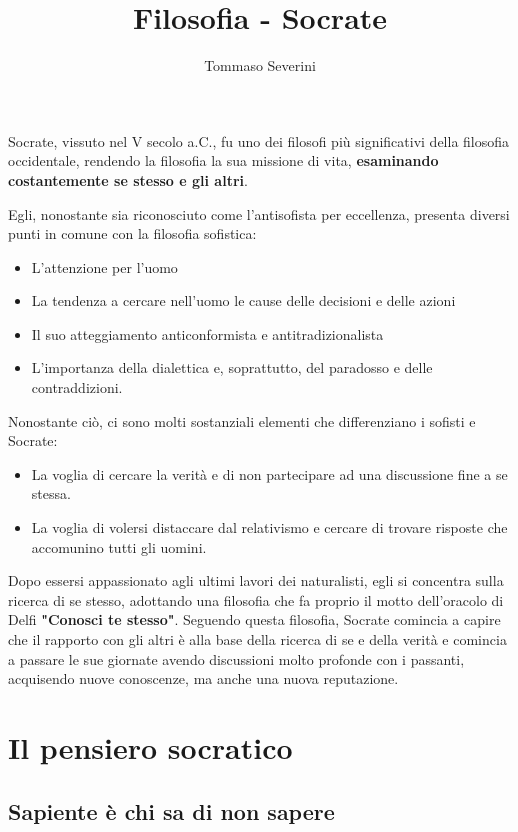 \documentclass[10pt,a4paper]{article}
\author{Tommaso Severini}
\title{Filosofia - Socrate}
\begin{document}
	\maketitle
	
	Socrate, vissuto nel V secolo a.C., fu uno dei filosofi più significativi della filosofia occidentale, rendendo la filosofia la sua missione di vita, \textbf{esaminando costantemente se stesso e gli altri}.
	
	Egli, nonostante sia riconosciuto come l'antisofista per eccellenza, presenta diversi punti in comune con la filosofia sofistica:
	\begin{itemize}
		\item L'attenzione per l'uomo
		\item La tendenza a cercare nell'uomo le cause delle decisioni e delle azioni
		\item Il suo atteggiamento anticonformista e antitradizionalista
		\item L'importanza della dialettica e, soprattutto, del paradosso e delle contraddizioni.
	\end{itemize}

	Nonostante ciò, ci sono molti sostanziali elementi che differenziano i sofisti e Socrate:
	\begin{itemize}
		\item La voglia di cercare la verità e di non partecipare ad una discussione fine a se stessa.
		\item La voglia di volersi distaccare dal relativismo e cercare di trovare risposte che accomunino tutti gli uomini.
	\end{itemize}

	Dopo essersi appassionato agli ultimi lavori dei naturalisti, egli si concentra sulla ricerca di se stesso, adottando una filosofia che fa proprio il motto dell'oracolo di Delfi \textbf{"Conosci te stesso"}. Seguendo questa filosofia, Socrate comincia a capire che il rapporto con gli altri è alla base della ricerca di se e della verità e comincia a passare le sue giornate avendo discussioni molto profonde con i passanti, acquisendo nuove conoscenze, ma anche una nuova reputazione.
	
	\section{Il pensiero socratico}
	
	\subsection{Sapiente è chi sa di non sapere}
	
\end{document}
